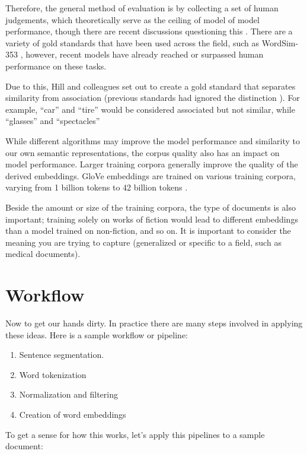 Therefore, the general method of evaluation is by collecting a set of human judgements, which theoretically serve as the ceiling of model of model performance, though there are recent discussions questioning this \cite{richie2022inter}.
There are a variety of gold standards that have been used across the field, such as WordSim-353 \cite{finkelstein2001placing, agirre2009study}, however, recent models have already reached or surpassed human performance on these tasks.

Due to this, Hill and colleagues set out to create a gold standard that separates similarity from association (previous standards had ignored the distinction \cite{hill2015simlex}). For example, ``car'' and ``tire'' would be considered associated but not similar, while ``glasses'' and ``spectacles''

While different algorithms may improve the model performance and similarity to our own semantic representations, the corpus quality also has an impact on model performance.
Larger training corpora generally improve the quality of the derived embeddings. 
GloVe embeddings are trained on various training corpora, varying from 1 billion tokens to 42 billion tokens \cite{pennington2014glove}.

Beside the amount or size of the training corpora, the type of documents is also important; training solely on works of fiction would lead to different embeddings than a model trained on non-fiction, and so on. It is important to consider the meaning you are trying to capture (generalized or specific to a field, such as medical documents).

\section{Workflow}


Now to get our hands dirty. In practice there are many steps involved in applying these ideas. 
Here is a sample workflow or pipeline:
\begin{enumerate}
\item Sentence segmentation.
\item Word tokenization
\item Normalization and filtering
\item Creation of word embeddings
\end{enumerate}

To get a sense for how this works, let's apply this pipelines to a sample document:

